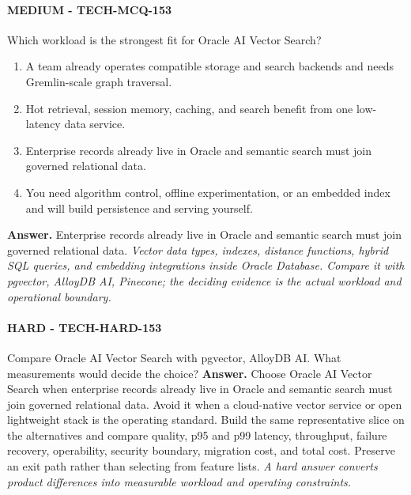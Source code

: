 \paragraph{MEDIUM - TECH-MCQ-153} Which workload is the strongest fit for Oracle AI Vector Search?
\begin{enumerate}[label=\Alph*.]
\item A team already operates compatible storage and search backends and needs Gremlin-scale graph traversal.
\item Hot retrieval, session memory, caching, and search benefit from one low-latency data service.
\item Enterprise records already live in Oracle and semantic search must join governed relational data.
\item You need algorithm control, offline experimentation, or an embedded index and will build persistence and serving yourself.
\end{enumerate}
\textbf{Answer.} Enterprise records already live in Oracle and semantic search must join governed relational data.
\textit{Vector data types, indexes, distance functions, hybrid SQL queries, and embedding integrations inside Oracle Database. Compare it with pgvector, AlloyDB AI, Pinecone; the deciding evidence is the actual workload and operational boundary.}
\paragraph{HARD - TECH-HARD-153} Compare Oracle AI Vector Search with pgvector, AlloyDB AI. What measurements would decide the choice?
\textbf{Answer.} Choose Oracle AI Vector Search when enterprise records already live in Oracle and semantic search must join governed relational data. Avoid it when a cloud-native vector service or open lightweight stack is the operating standard. Build the same representative slice on the alternatives and compare quality, p95 and p99 latency, throughput, failure recovery, operability, security boundary, migration cost, and total cost. Preserve an exit path rather than selecting from feature lists.
\textit{A hard answer converts product differences into measurable workload and operating constraints.}
